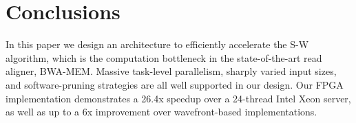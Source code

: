 \section{Conclusions} 
\label{sec:conclusions}
In this paper we design an architecture to efficiently accelerate the S-W algorithm, which is the computation bottleneck in the state-of-the-art read aligner, BWA-MEM. 
Massive task-level parallelism, sharply varied input sizes, and software-pruning strategies are all well supported in our design. 
Our FPGA implementation demonstrates a 26.4x speedup over a 24-thread Intel Xeon server, as well as up to a 6x improvement over wavefront-based implementations. 


\vspace{-5pt}
